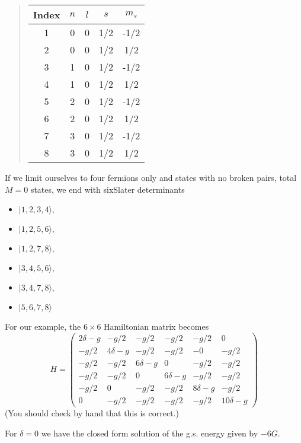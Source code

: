 \documentclass[%
twoside,                 %
final,                   %
10pt]{article}
\begin{document}
\begin{quote}
\begin{tabular}{ccccc}
\hline
\multicolumn{1}{c}{ Index } & \multicolumn{1}{c}{ $n$ } & \multicolumn{1}{c}{ $l$ } & \multicolumn{1}{c}{ $s$ } & \multicolumn{1}{c}{ $m_s$ } \\
\hline
1     & 0   & 0   & 1/2 & -1/2  \\
2     & 0   & 0   & 1/2 & 1/2   \\
3     & 1   & 0   & 1/2 & -1/2  \\
4     & 1   & 0   & 1/2 & 1/2   \\
5     & 2   & 0   & 1/2 & -1/2  \\
6     & 2   & 0   & 1/2 & 1/2   \\
7     & 3   & 0   & 1/2 & -1/2  \\
8     & 3   & 0   & 1/2 & 1/2   \\
\hline
\end{tabular}
\end{quote}

\noindent

If we limit ourselves to four fermions only and states with no broken pairs, 
total $M=0$ states, we end with  sixSlater  determinants

\begin{itemize}
\item $|           1,           2 ,          3         ,       4  \rangle , $

\item $|            1      ,     2        ,        5         ,       6 \rangle , $

\item $|            1         ,       2     ,           7         ,       8  \rangle , $

\item $|            3        ,        4      ,          5          ,      6  \rangle , $

\item $|            3        ,        4      ,          7         ,       8  \rangle , $

\item $|            5        ,        6     ,           7     ,           8  \rangle $
\end{itemize}

\noindent
For our example, the $ 6 \times 6$  Hamiltonian matrix becomes
\[
H = \left ( 
\begin{array}{cccccc}
2\delta -g & -g/2 & -g/2 & -g/2 & -g/2 & 0 \\
 -g/2 & 4\delta -g & -g/2 & -g/2 & -0 & -g/2 \\
-g/2 & -g/2 & 6\delta -g & 0 & -g/2 & -g/2 \\
 -g/2 & -g/2 & 0 & 6\delta-g & -g/2 & -g/2 \\
 -g/2 & 0 & -g/2 & -g/2 & 8\delta-g & -g/2 \\
0 & -g/2 & -g/2 & -g/2 & -g/2 & 10\delta -g 
\end{array} \right )
\]
(You should check by hand that this is correct.) 

For $\delta = 0$ we have the closed form solution of  the g.s. energy given by $-6G$.







\printindex
\end{document}
